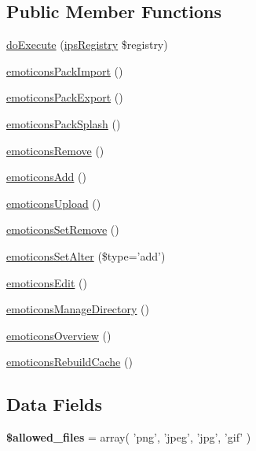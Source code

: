 \subsection*{Public Member Functions}
\begin{DoxyCompactItemize}
\item 
\hyperlink{classadmin__core__posts__emoticons_afbc4e912a0604b94d47d66744c64d8ba}{do\-Execute} (\hyperlink{classips_registry}{ips\-Registry} \$registry)
\item 
\hyperlink{classadmin__core__posts__emoticons_a7e915f6bc61ba6f27e17613f72809baa}{emoticons\-Pack\-Import} ()
\item 
\hyperlink{classadmin__core__posts__emoticons_a0b987117a1d37fd4ad43cad6656c31ee}{emoticons\-Pack\-Export} ()
\item 
\hyperlink{classadmin__core__posts__emoticons_a6142b3724e1d96892b0e4e81b109c6e3}{emoticons\-Pack\-Splash} ()
\item 
\hyperlink{classadmin__core__posts__emoticons_a66d13f13279f7ca0301f5fe1f4010f2f}{emoticons\-Remove} ()
\item 
\hyperlink{classadmin__core__posts__emoticons_a9380cbb503b34e7a560193986df06115}{emoticons\-Add} ()
\item 
\hyperlink{classadmin__core__posts__emoticons_a93969989e271da64e4c66994b7108451}{emoticons\-Upload} ()
\item 
\hyperlink{classadmin__core__posts__emoticons_a2607c616443b55ee76d03b2f986e2ba9}{emoticons\-Set\-Remove} ()
\item 
\hyperlink{classadmin__core__posts__emoticons_acb6360f04373076bc0b52642e8d9b6ed}{emoticons\-Set\-Alter} (\$type='add')
\item 
\hyperlink{classadmin__core__posts__emoticons_a58aed657ea5c24e4c4255649036c22d2}{emoticons\-Edit} ()
\item 
\hyperlink{classadmin__core__posts__emoticons_a3ac9fe221f3112553963562424995051}{emoticons\-Manage\-Directory} ()
\item 
\hyperlink{classadmin__core__posts__emoticons_a86dcd543f78927fc82d1ff239705ed21}{emoticons\-Overview} ()
\item 
\hyperlink{classadmin__core__posts__emoticons_a522fd29e9d0205d65ed231993bfe9afb}{emoticons\-Rebuild\-Cache} ()
\end{DoxyCompactItemize}
\subsection*{Data Fields}
\begin{DoxyCompactItemize}
\item 
\hypertarget{classadmin__core__posts__emoticons_a23e5e57745a9266738fc0ce5877c8221}{{\bfseries \$allowed\-\_\-files} = array( 'png', 'jpeg', 'jpg', 'gif' )}\label{classadmin__core__posts__emoticons_a23e5e57745a9266738fc0ce5877c8221}

\end{DoxyCompactItemize}
